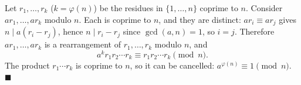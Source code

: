 Let $r_1,\dots,r_k$ ($k=\varphi(n)$) be the residues in $\{1,\dots,n\}$ coprime to $n$. Consider $ar_1,\dots,ar_k$ modulo $n$. Each is coprime to $n$, and they are distinct: $ar_i\equiv ar_j$ gives $n\mid a(r_i-r_j)$, hence $n\mid r_i-r_j$ since $\gcd(a,n)=1$, so $i=j$. Therefore $ar_1,\dots,ar_k$ is a rearrangement of $r_1,\dots,r_k$ modulo $n$, and
\[a^kr_1r_2\cdots r_k\equiv r_1r_2\cdots r_k\pmod n.\]
The product $r_1\cdots r_k$ is coprime to $n$, so it can be cancelled: $a^{\varphi(n)}\equiv1\pmod n$. $\blacksquare$
